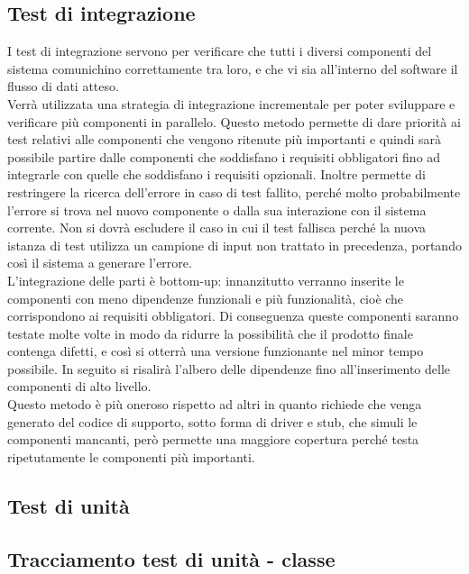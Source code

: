 			
	\subsection{Test di integrazione}
	\label{testDiIntegrazione}
		I test di integrazione servono per verificare che tutti i diversi componenti del sistema comunichino correttamente tra loro, e che vi sia all'interno del software il flusso di dati atteso. \\
		Verrà utilizzata una strategia di integrazione incrementale per poter sviluppare e verificare più componenti in parallelo. Questo metodo permette di dare priorità ai test relativi alle componenti che vengono ritenute più importanti e quindi sarà possibile partire dalle componenti che soddisfano i requisiti obbligatori fino ad integrarle con quelle che soddisfano i requisiti opzionali. Inoltre permette di restringere la ricerca dell'errore in caso di test fallito, perché molto probabilmente l'errore si trova nel nuovo componente o dalla sua interazione con il sistema corrente. Non si dovrà escludere il caso in cui il test fallisca perché la nuova istanza di test utilizza un campione di input non trattato in precedenza, portando così il sistema a generare l'errore. \\
		L'integrazione delle parti è bottom-up: innanzitutto verranno inserite le componenti con meno dipendenze funzionali e più funzionalità, cioè che corrispondono ai requisiti obbligatori. Di conseguenza queste componenti saranno testate molte volte in modo da ridurre la possibilità che il prodotto finale contenga difetti, e così si otterrà una versione funzionante nel minor tempo possibile. In seguito si risalirà l'albero delle dipendenze fino all'inserimento delle componenti di alto livello. \\
		Questo metodo è più oneroso rispetto ad altri in quanto richiede che venga generato del codice di supporto, sotto forma di driver e stub, che simuli le componenti mancanti, però permette una maggiore copertura perché testa ripetutamente le componenti più importanti.
		
		
		\newpage
		\subsection{Test di unità}
		\label{testDiUnita}
		
		\subsection{Tracciamento test di unità - classe}
		